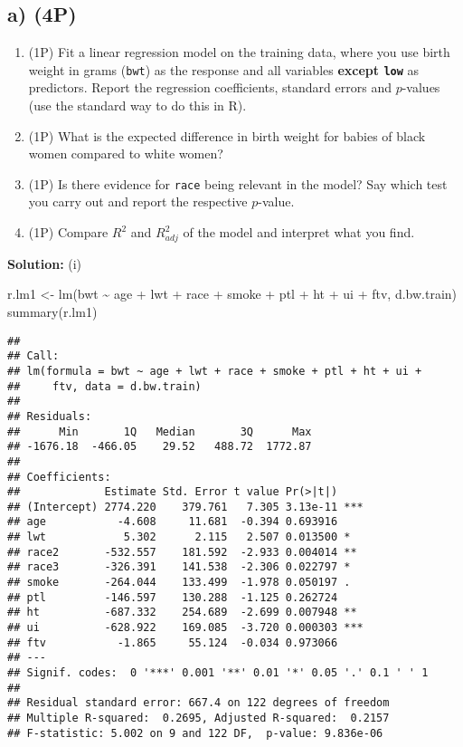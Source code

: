 \documentclass[
]{article}
\newenvironment{Shaded}{\begin{snugshade}}{\end{snugshade}}
\newcommand{\FunctionTok}[1]{\textcolor[rgb]{0.00,0.00,0.00}{#1}}
\newcommand{\NormalTok}[1]{#1}
\newcommand{\OtherTok}[1]{\textcolor[rgb]{0.56,0.35,0.01}{#1}}
\newcommand{\SpecialCharTok}[1]{\textcolor[rgb]{0.00,0.00,0.00}{#1}}
\begin{document}
\hypertarget{a-4p}{%
\subsection{a) (4P)}\label{a-4p}}

\begin{enumerate}
\def\labelenumi{(\roman{enumi})}
\item
  (1P) Fit a linear regression model on the training data, where you use
  birth weight in grams (\texttt{bwt}) as the response and all variables
  \textbf{except \texttt{low}} as predictors. Report the regression
  coefficients, standard errors and \(p\)-values (use the standard way
  to do this in R).
\item
  (1P) What is the expected difference in birth weight for babies of
  black women compared to white women?
\item
  (1P) Is there evidence for \texttt{race} being relevant in the model?
  Say which test you carry out and report the respective \(p\)-value.
\item
  (1P) Compare \(R^2\) and \(R^2_{adj}\) of the model and interpret what
  you find.
\end{enumerate}

\textbf{Solution:} (i)

\begin{Shaded}
\begin{Highlighting}[]
\NormalTok{r.lm1 }\OtherTok{\textless{}{-}} \FunctionTok{lm}\NormalTok{(bwt }\SpecialCharTok{\textasciitilde{}}\NormalTok{ age }\SpecialCharTok{+}\NormalTok{ lwt }\SpecialCharTok{+}\NormalTok{ race }\SpecialCharTok{+}\NormalTok{ smoke }\SpecialCharTok{+}\NormalTok{ ptl }\SpecialCharTok{+}\NormalTok{ ht }\SpecialCharTok{+}\NormalTok{ ui }\SpecialCharTok{+}\NormalTok{ ftv, d.bw.train)}
\FunctionTok{summary}\NormalTok{(r.lm1)}
\end{Highlighting}
\end{Shaded}

\begin{verbatim}
## 
## Call:
## lm(formula = bwt ~ age + lwt + race + smoke + ptl + ht + ui + 
##     ftv, data = d.bw.train)
## 
## Residuals:
##      Min       1Q   Median       3Q      Max 
## -1676.18  -466.05    29.52   488.72  1772.87 
## 
## Coefficients:
##             Estimate Std. Error t value Pr(>|t|)    
## (Intercept) 2774.220    379.761   7.305 3.13e-11 ***
## age           -4.608     11.681  -0.394 0.693916    
## lwt            5.302      2.115   2.507 0.013500 *  
## race2       -532.557    181.592  -2.933 0.004014 ** 
## race3       -326.391    141.538  -2.306 0.022797 *  
## smoke       -264.044    133.499  -1.978 0.050197 .  
## ptl         -146.597    130.288  -1.125 0.262724    
## ht          -687.332    254.689  -2.699 0.007948 ** 
## ui          -628.922    169.085  -3.720 0.000303 ***
## ftv           -1.865     55.124  -0.034 0.973066    
## ---
## Signif. codes:  0 '***' 0.001 '**' 0.01 '*' 0.05 '.' 0.1 ' ' 1
## 
## Residual standard error: 667.4 on 122 degrees of freedom
## Multiple R-squared:  0.2695, Adjusted R-squared:  0.2157 
## F-statistic: 5.002 on 9 and 122 DF,  p-value: 9.836e-06
\end{verbatim}
\end{document}
